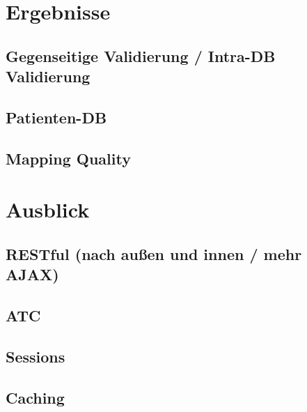 \section{Ergebnisse}

\subsection{Gegenseitige Validierung / Intra-DB Validierung}

\subsection{Patienten-DB}

\subsection{Mapping Quality}

\section{Ausblick}

\subsection{RESTful (nach außen und innen / mehr AJAX)}

\subsection{ATC}

\subsection{Sessions}

\subsection{Caching}

